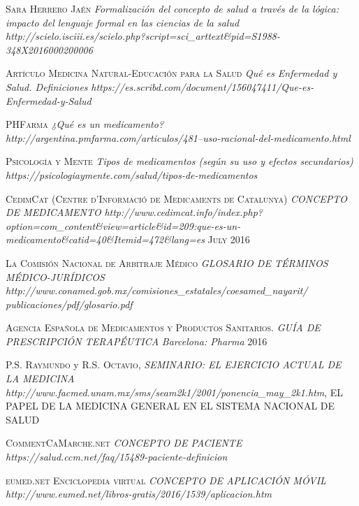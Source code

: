 
\begin{thebibliography}{X}
	
	 \textsc{Sara Herrero Jaén} \textit{Formalización del concepto de salud a través de la lógica: impacto del lenguaje formal en las ciencias de la salud} \textit{http://scielo.isciii.es/scielo.php?script=sci\_arttext\&pid=S1988-348X2016000200006} 
	
	 \textsc{Artículo Medicina Natural-Educación para la Salud} \textit{Qué es Enfermedad y Salud. Definiciones} \textit{https://es.scribd.com/document/156047411/Que-es-Enfermedad-y-Salud} 
	
	 \textsc{PHFarma} \textit{¿Qué es un medicamento?} \textit{http://argentina.pmfarma.com/articulos/481--uso-racional-del-medicamento.html} 
	
	 \textsc{Psicología y Mente} \textit{Tipos de medicamentos (según su uso y efectos secundarios)} \textit{https://psicologiaymente.com/salud/tipos-de-medicamentos}
	
	 \textsc{CedimCat (Centre d'Informació de Medicaments de Catalunya)} \textit{CONCEPTO DE MEDICAMENTO} \textit{http://www.cedimcat.info/index.php?option=com\_content\&view=article\&id=209:que-es-un-medicamento\&catid=40\&Itemid=472\&lang=es} \textsc{July 2016}
	
	 \textsc{La Comisión Nacional de Arbitraje Médico} \textit{GLOSARIO DE TÉRMINOS MÉDICO-JURÍDICOS} \textit{http://www.conamed.gob.mx/comisiones\_estatales/coesamed\_nayarit/
publicaciones/pdf/glosario.pdf}
	
	 \textsc{Agencia Española de Medicamentos y Productos Sanitarios.} \textit{GUÍA DE PRESCRIPCIÓN TERAPÉUTICA} \textit{Barcelona: Pharma} \textsc{2016}
	
	 \textsc{P.S. Raymundo} y \textsc{R.S. Octavio}, \textit{SEMINARIO: EL EJERCICIO ACTUAL DE LA MEDICINA}
	\textit{http://www.facmed.unam.mx/sms/seam2k1/2001/ponencia\_may\_2k1.htm}, EL PAPEL DE LA MEDICINA GENERAL EN EL SISTEMA NACIONAL DE SALUD
	
	 \textsc{CommentCaMarche.net} \textit{CONCEPTO DE PACIENTE} \textit{https://salud.ccm.net/faq/15489-paciente-definicion}
	
	 \textsc{eumed.net Enciclopedia virtual} \textit{CONCEPTO DE APLICACIÓN MÓVIL} \textit{http://www.eumed.net/libros-gratis/2016/1539/aplicacion.htm}
	

\end{thebibliography}
